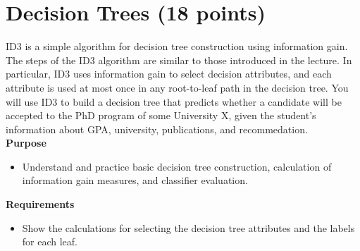 \documentclass[12pt,letterpaper]{article}
\begin{document}
				
				
				\section{Decision Trees (18 points)}
				\label{sec:dt}
				ID3 is a simple algorithm for decision tree construction using information gain. The steps of the ID3 algorithm are similar to those introduced in the lecture. In particular, ID3 uses information gain to select decision attributes, and each attribute is used at most once in any root-to-leaf path in the decision tree. You will use ID3 to build a decision tree that predicts whether a candidate will be accepted to the PhD program of some University X, given the student's information about GPA, university, publications, and recommedation.\\
				
				\textbf{Purpose} 
				\begin{itemize}
					\item Understand and practice basic decision tree construction, calculation of information gain measures, and classifier evaluation.
				\end{itemize}
				
				\textbf{Requirements}
				\begin{itemize}
					\item Show the calculations for selecting the decision tree attributes and the labels for each leaf.
				\end{itemize}
				
\end{document}
